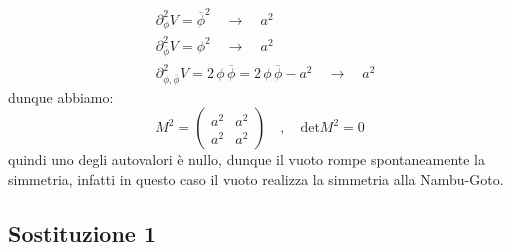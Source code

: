 \begin{align}
    &\partial_\phi^2 V = \overline{\phi}^2 \quad \longrightarrow \quad a^2 \\
    &\partial_{\overline{\phi}}^2 V = \phi^2 \quad \longrightarrow \quad a^2 \\
    &\partial_{\phi,\overline{\phi}}^2 V = 2\, \phi\, \overline{\phi} = 2\, \phi\, \overline{\phi} - a^2 \quad \longrightarrow\quad a^2
\end{align}
dunque abbiamo:
\begin{equation}
    M^2 = \begin{pmatrix}
        a^2 & a^2 \\
        a^2 & a^2
    \end{pmatrix} \quad , \quad \text{det}M^2 = 0
\end{equation}
quindi uno degli autovalori è nullo, dunque il vuoto rompe spontaneamente la simmetria, infatti in questo caso il vuoto realizza la simmetria alla Nambu-Goto.


\subsection{Sostituzione 1}

